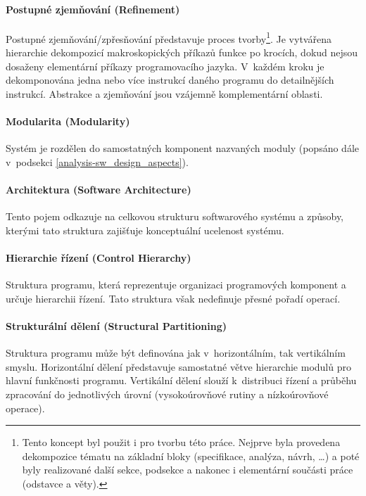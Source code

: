 \paragraph{Postupné zjemňování (Refinement)} Postupné zjemňování/zpřesňování představuje proces tvorby\footnote{Tento koncept byl použit i pro tvorbu této práce. Nejprve byla provedena dekompozice tématu na základní bloky (specifikace, analýza, návrh, \ldots) a poté byly  realizované další sekce, podsekce a nakonec i elementární součásti práce (odstavce a věty).}. Je vytvářena hierarchie dekompozicí makroskopických příkazů funkce po krocích, dokud nejsou dosaženy elementární příkazy programovacího jazyka. V~každém kroku je dekomponována jedna nebo více instrukcí daného programu do detailnějších instrukcí. Abstrakce a zjemňování jsou vzájemně komplementární oblasti.

\paragraph{Modularita (Modularity)} Systém je rozdělen do samostatných komponent nazvaných moduly (popsáno dále v~podsekci \ref{analysis-sw_design_aspects}).

\paragraph{Architektura (Software Architecture)} Tento pojem odkazuje na celkovou strukturu softwarového systému a způsoby, kterými tato struktura zajišťuje konceptuální ucelenost systému.

\paragraph{Hierarchie řízení (Control Hierarchy)} Struktura programu, která reprezentuje organizaci programových komponent a určuje hierarchii řízení. Tato struktura však nedefinuje přesné pořadí operací.

\paragraph{Strukturální dělení (Structural Partitioning)} Struktura programu může být definována jak v~horizontálním, tak vertikálním smyslu. Horizontální dělení představuje samostatné větve hierarchie modulů pro hlavní funkčnosti programu. Vertikální dělení slouží k~distribuci řízení a průběhu zpracování do jednotlivých úrovní (vysokoúrovňové rutiny a nízkoúrovňové operace).

